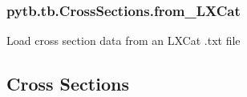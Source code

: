 \documentclass[letterpaper,10pt,english,openany,oneside]{sphinxmanual}
\begin{document}
\begin{fulllineitems}
\begin{quote}
\begin{description}
\end{description}\end{quote}

\end{fulllineitems}


\sphinxstepscope


\subsubsection{pytb.tb.CrossSections.from\_LXCat}
\label{\detokenize{api/pytb.tb.CrossSections.from_LXCat:pytb-tb-crosssections-from-lxcat}}\label{\detokenize{api/pytb.tb.CrossSections.from_LXCat::doc}}

\begin{fulllineitems}
\label{\detokenize{api/pytb.tb.CrossSections.from_LXCat:pytb.tb.CrossSections.from_LXCat}}
\pysigstartsignatures
{}
\pysigstopsignatures
\sphinxAtStartPar
Load cross section data from an LXCat .txt file

\end{fulllineitems}



\subsection{Cross Sections}
\label{\detokenize{ref:cross-sections}}
\end{document}
